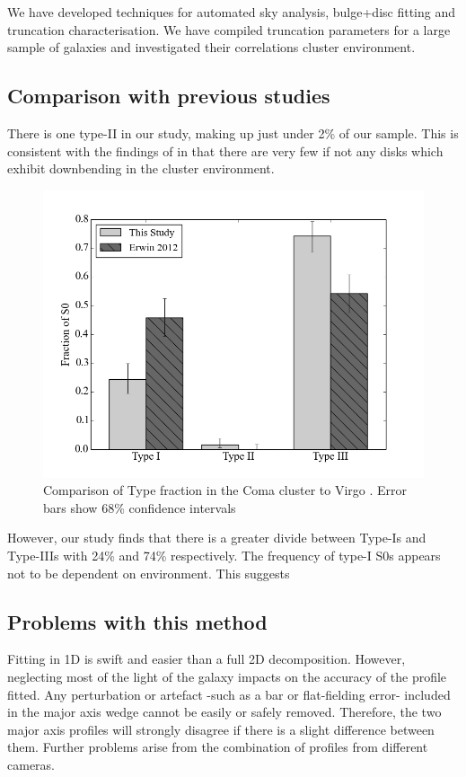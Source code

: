 
We have developed techniques for automated sky analysis, bulge+disc fitting and truncation characterisation. We have compiled truncation parameters for a large sample of galaxies and investigated their correlations cluster environment. 

\subsection{Comparison with previous studies}
There is one type-II in our study, making up just under 2\% of our sample. This is consistent with the findings of \citet{erwin_strong_2012} in that there are very few if not any disks which exhibit downbending in the cluster environment. 
\begin{figure}
	\centering
	\includegraphics[width=\textwidth]{figs/total_bar_chart_truncs.png}
	\caption{Comparison of Type fraction in the Coma cluster to Virgo \citep{erwin_strong_2012}. Error bars show 68\% confidence intervals \citep{wilson_probable_1927}}
\end{figure}
However, our study finds that there is a greater divide between Type-Is and Type-IIIs with 24\% and 74\% respectively. The frequency of type-I S0s appears not to be dependent on environment. This suggests 


\subsection{Problems with this method}
Fitting in 1D is swift and easier than a full 2D decomposition. However, neglecting most of the light of the galaxy impacts on the accuracy of the profile fitted. Any perturbation or artefact -such as a bar or flat-fielding error- included in the major axis wedge cannot be easily or safely removed. Therefore, the two major axis profiles will strongly disagree if there is a slight difference between them. Further problems arise from the combination of profiles from different cameras. 

